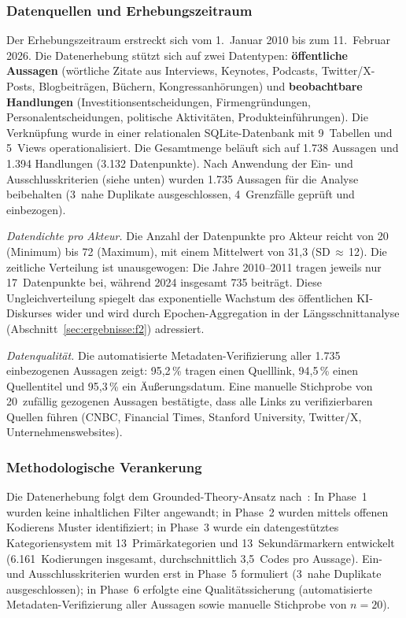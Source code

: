 \documentclass[12pt,a4paper]{article}
\begin{document}
\subsubsection{Datenquellen und Erhebungszeitraum}

Der Erhebungszeitraum erstreckt sich vom 1.~Januar 2010 bis zum 11.~Februar 2026. Die Datenerhebung stützt sich auf zwei Datentypen: \textbf{öffentliche Aussagen} (wörtliche Zitate aus Interviews, Keynotes, Podcasts, Twitter/X-Posts, Blogbeiträgen, Büchern, Kongressanhörungen) und \textbf{beobachtbare Handlungen} (Investitionsentscheidungen, Firmengründungen, Personalentscheidungen, politische Aktivitäten, Produkteinführungen). Die Verknüpfung wurde in einer relationalen SQLite-Datenbank mit 9~Tabellen und 5~Views operationalisiert. Die Gesamtmenge beläuft sich auf 1.738 Aussagen und 1.394 Handlungen (3.132 Datenpunkte). Nach Anwendung der Ein- und Ausschlusskriterien (siehe unten) wurden 1.735 Aussagen für die Analyse beibehalten (3~nahe Duplikate ausgeschlossen, 4~Grenzfälle geprüft und einbezogen).

\emph{Datendichte pro Akteur.} Die Anzahl der Datenpunkte pro Akteur reicht von 20 (Minimum) bis 72 (Maximum), mit einem Mittelwert von 31,3 (SD\,$\approx$\,12). Die zeitliche Verteilung ist unausgewogen: Die Jahre 2010--2011 tragen jeweils nur 17~Datenpunkte bei, während 2024 insgesamt 735 beiträgt. Diese Ungleichverteilung spiegelt das exponentielle Wachstum des öffentlichen KI-Diskurses wider und wird durch Epochen-Aggregation in der Längsschnittanalyse (Abschnitt~\ref{sec:ergebnisse:f2}) adressiert.

\emph{Datenqualität.} Die automatisierte Metadaten-Verifizierung aller 1.735 einbezogenen Aussagen zeigt: 95,2\,\% tragen einen Quelllink, 94,5\,\% einen Quellentitel und 95,3\,\% ein Äußerungsdatum. Eine manuelle Stichprobe von 20~zufällig gezogenen Aussagen bestätigte, dass alle Links zu verifizierbaren Quellen führen (CNBC, Financial Times, Stanford University, Twitter/X, Unternehmenswebsites).

\subsubsection{Methodologische Verankerung}

Die Datenerhebung folgt dem Grounded-Theory-Ansatz nach~\citet{StraussCorbin1990}: In Phase~1 wurden keine inhaltlichen Filter angewandt; in Phase~2 wurden mittels offenen Kodierens Muster identifiziert; in Phase~3 wurde ein datengestütztes Kategoriensystem mit 13~Primärkategorien und 13~Sekundärmarkern entwickelt (6.161~Kodierungen insgesamt, durchschnittlich 3,5~Codes pro Aussage). Ein- und Ausschlusskriterien wurden erst in Phase~5 formuliert (3~nahe Duplikate ausgeschlossen); in Phase~6 erfolgte eine Qualitätssicherung (automatisierte Metadaten-Verifizierung aller Aussagen sowie manuelle Stichprobe von $n = 20$).
\end{document}

